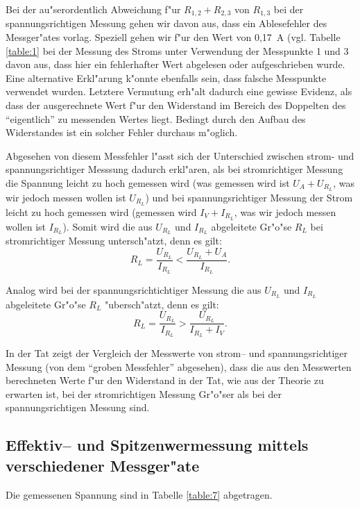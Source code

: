 \documentclass[10pt]{scrartcl}
\begin{document}
Bei der au"serordentlich Abweichung f"ur $R_{1, 2}+R_{2, 3}$ von $R_{1, 3}$ bei der spannungsrichtigen Messung gehen wir davon aus, dass ein Ablesefehler des Messger"ates vorlag. Speziell gehen wir f"ur den Wert von 0,17~A (vgl. Tabelle \ref{table:1} bei der Messung des Stroms unter Verwendung der Messpunkte 1 und 3 davon aus, dass hier ein fehlerhafter Wert abgelesen oder aufgeschrieben wurde. Eine alternative Erkl"arung k"onnte ebenfalls sein, dass falsche Messpunkte verwendet wurden. Letztere Vermutung erh"alt dadurch eine gewisse Evidenz, als dass der ausgerechnete Wert f"ur den Widerstand im Bereich des Doppelten des "`eigentlich"' zu messenden Wertes liegt. Bedingt durch den Aufbau des Widerstandes ist ein solcher Fehler durchaus m"oglich. 

Abgesehen von diesem Messfehler l"asst sich der Unterschied zwischen strom- und spannungsrichtiger Messsung dadurch erkl"aren, als bei stromrichtiger Messung die Spannung leicht zu hoch gemessen wird (was gemessen wird ist $U_A+U_{R_L}$, was wir jedoch messen wollen ist $U_{R_L}$) und bei spannungsrichtiger Messung der Strom leicht zu hoch gemessen wird (gemessen wird $I_V+I_{R_L}$, was wir jedoch messen wollen ist $I_{R_L}$). Somit wird die aus $U_{R_L}$ und $I_{R_L}$ abgeleitete Gr"o"se $R_L$ bei stromrichtiger Messung untersch"atzt, denn es gilt:
\begin{displaymath}
R_L = \frac{U_{R_L}}{I_{R_L}} < \frac{U_{R_L}+U_A}{I_{R_L}}.
\end{displaymath}

Analog wird bei der spannungsrichtichtiger Messung die aus $U_{R_L}$ und $I_{R_L}$ abgeleitete Gr"o"se $R_L$ "ubersch"atzt, denn es gilt:
\begin{displaymath}
R_L = \frac{U_{R_L}}{I_{R_L}} > \frac{U_{R_L}}{I_{R_L}+I_V}.
\end{displaymath}

In der Tat zeigt der Vergleich der Messwerte von strom-- und spannungsrichtiger Messung (von dem "`groben Messfehler"' abgesehen), dass die aus den Messwerten berechneten Werte f"ur den Widerstand in der Tat, wie aus der Theorie zu erwarten ist, bei der stromrichtigen Messung Gr"o"ser als bei der spannungsrichtigen Messung sind.

\subsection{Effektiv-- und Spitzenwermessung mittels verschiedener Messger"ate}

Die gemessenen Spannung sind in Tabelle \ref{table:7} abgetragen.
\end{document}
